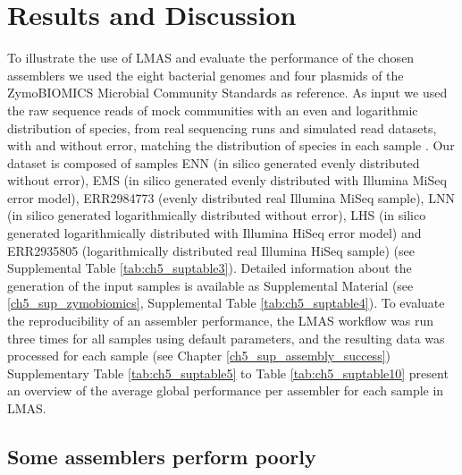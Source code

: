 \section{Results and Discussion}

To illustrate the use of LMAS and evaluate the performance of the chosen assemblers we used the eight bacterial genomes and four plasmids of the ZymoBIOMICS Microbial Community Standards as reference. As input we used the raw sequence reads of mock communities with an even and logarithmic distribution of species, from real sequencing runs \cite{nicholls_ultra-deep_2019} and simulated read datasets, with and without error, matching the distribution of species in each sample \cite{gourle_simulating_2019}. Our dataset is composed of samples ENN (in silico generated evenly distributed without error), EMS (in silico generated evenly distributed with Illumina MiSeq error model), ERR2984773 (evenly distributed real Illumina MiSeq sample), LNN (in silico generated logarithmically distributed without error), LHS (in silico generated logarithmically distributed with Illumina HiSeq error model) and ERR2935805 (logarithmically distributed real Illumina HiSeq sample) (see Supplemental Table \ref{tab:ch5_suptable3}). Detailed information about the generation of the input samples is available as Supplemental Material (see \ref{ch5_sup_zymobiomics}, Supplemental Table \ref{tab:ch5_suptable4}). To evaluate the reproducibility of an assembler performance, the LMAS workflow was run three times for all samples using default parameters, and the resulting data was processed for each sample (see Chapter \ref{ch5_sup_assembly_success}) Supplementary Table \ref{tab:ch5_suptable5} to Table \ref{tab:ch5_suptable10} present an overview of the average global performance per assembler for each sample in LMAS. 

\subsection{Some assemblers perform poorly}

